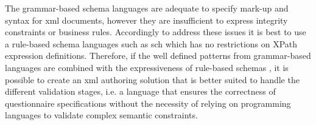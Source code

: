 	The grammar-based schema languages are adequate to specify mark-up and syntax for \gls{xml} documents, however they are insufficient to express integrity constraints or business rules. Accordingly to address these issues it is best to use a rule-based schema languages such as \gls{sch} which has no restrictions on XPath expression definitions. %
	Therefore, if the well defined patterns from grammar-based languages are combined with the expressiveness of rule-based schemas \cite{proc:vandervlist06} \cite{web:costello15} \cite{art:lee00}, it is possible to create an \gls{xml} authoring solution that is better suited to handle the different validation stages, i.e. a language that ensures the correctness of questionnaire specifications without the necessity of relying on programming languages to validate complex semantic constraints.
